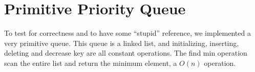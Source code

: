 \section*{Primitive Priority Queue}
To test for correctness and to have some ``stupid'' reference, we implemented a very primitive queue. This queue is a linked list, and initializing, inserting, deleting and decrease key are all constant operations. The find min operation scan the entire list and return the minimum element, a $O(n)$ operation.